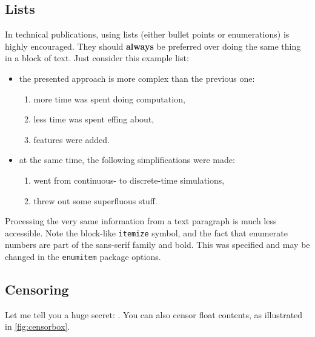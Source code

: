 \subsection{Lists}
In technical publications, using lists (either bullet points or enumerations) is highly encouraged.
They should \textbf{always} be preferred over doing the same thing in a block of text.
Just consider this example list:
\begin{itemize}
	\item the presented approach is more complex than the previous one:
	\begin{enumerate}
		\item more time was spent doing computation,
		\item less time was spent effing about,
		\item features were added.
	\end{enumerate}
	\item at the same time, the following simplifications were made:
	\begin{enumerate}
		\item went from continuous- to discrete-time simulations,
		\item threw out some superfluous stuff.
	\end{enumerate}
\end{itemize}
Processing the very same information from a text paragraph is much less accessible.
Note the block-like \texttt{itemize} symbol, and the fact that enumerate numbers are part of the sans-serif family and bold.
This was specified and may be changed in the \texttt{enumitem} package options.
\subsection{Censoring}
Let me tell you a huge secret:  .
You can also censor float contents, as illustrated in \cref{fig:censorbox}.
\begin{figure}
	{%
	}
\end{figure}
